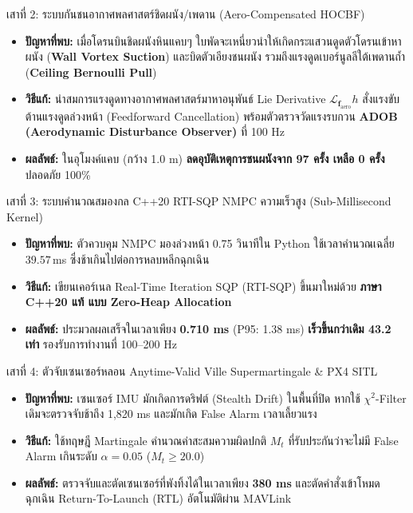 \documentclass[10pt,a4paper]{article}
\begin{document}
\vspace{4pt}
\begin{infobox}[secondary]{เสาที่ 2: ระบบกันชนอากาศพลศาสตร์ชิดผนัง/เพดาน (Aero-Compensated HOCBF)}
\begin{itemize}[leftmargin=14pt, itemsep=2pt]
  \item \textbf{ปัญหาที่พบ:} เมื่อโดรนบินชิดผนังหินแคบๆ ใบพัดจะเหนี่ยวนำให้เกิดกระแสวนดูดตัวโดรนเข้าหาผนัง (\textbf{Wall Vortex Suction}) และบิดตัวเอียงชนผนัง รวมถึงแรงดูดเบอร์นูลลีใต้เพดานถ้ำ (\textbf{Ceiling Bernoulli Pull})
  \item \textbf{วิธีแก้:} นำสมการแรงดูดทางอากาศพลศาสตร์มาหาอนุพันธ์ Lie Derivative $\mathcal{L}_{\mathbf{f}_{\text{aero}}} h$ สั่งแรงขับต้านแรงดูดล่วงหน้า (Feedforward Cancellation) พร้อมตัวตรวจวัดแรงรบกวน \textbf{ADOB (Aerodynamic Disturbance Observer)} ที่ 100 Hz
  \item \textbf{ผลลัพธ์:} ในอุโมงค์แคบ (กว้าง 1.0 m) \textbf{ลดอุบัติเหตุการชนผนังจาก 97 ครั้ง เหลือ 0 ครั้ง} ปลอดภัย 100\%
\end{itemize}
\end{infobox}

\vspace{4pt}
\begin{infobox}{เสาที่ 3: ระบบคำนวณสมองกล C++20 RTI-SQP NMPC ความเร็วสูง (Sub-Millisecond Kernel)}
\begin{itemize}[leftmargin=14pt, itemsep=2pt]
  \item \textbf{ปัญหาที่พบ:} ตัวควบคุม NMPC มองล่วงหน้า 0.75 วินาทีใน Python ใช้เวลาคำนวณเฉลี่ย $39.57\,$ms ซึ่งช้าเกินไปต่อการหลบหลีกฉุกเฉิน
  \item \textbf{วิธีแก้:} เขียนเคอร์เนล Real-Time Iteration SQP (RTI-SQP) ขึ้นมาใหม่ด้วย \textbf{ภาษา C++20 แท้ แบบ Zero-Heap Allocation}
  \item \textbf{ผลลัพธ์:} ประมวลผลเสร็จในเวลาเพียง \textbf{0.710 ms} (P95: 1.38 ms) \textbf{เร็วขึ้นกว่าเดิม 43.2 เท่า} รองรับการทำงานที่ 100–200 Hz
\end{itemize}
\end{infobox}

\vspace{4pt}
\begin{infobox}{เสาที่ 4: ตัวจับเซนเซอร์หลอน Anytime-Valid Ville Supermartingale \& PX4 SITL}
\begin{itemize}[leftmargin=14pt, itemsep=2pt]
  \item \textbf{ปัญหาที่พบ:} เซนเซอร์ IMU มักเกิดการดริฟต์ (Stealth Drift) ในพื้นที่ปิด หากใช้ $\chi^2$-Filter เดิมจะตรวจจับช้าถึง 1,820 ms และมักเกิด False Alarm เวลาเลี้ยวแรง
  \item \textbf{วิธีแก้:} ใช้ทฤษฎี Martingale คำนวณค่าสะสมความผิดปกติ $M_t$ ที่รับประกันว่าจะไม่มี False Alarm เกินระดับ $\alpha = 0.05$ ($M_t \ge 20.0$)
  \item \textbf{ผลลัพธ์:} ตรวจจับและตัดเซนเซอร์ที่พังทิ้งได้ในเวลาเพียง \textbf{380 ms} และตัดคำสั่งเข้าโหมดฉุกเฉิน Return-To-Launch (RTL) อัตโนมัติผ่าน MAVLink
\end{itemize}
\end{infobox}
\end{document}
